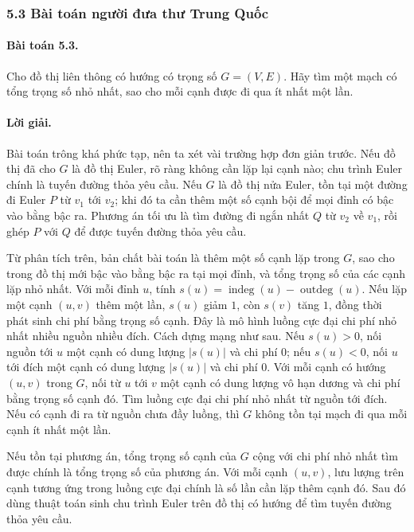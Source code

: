 \documentclass[11pt]{article}
\begin{document}
\subsubsection*{5.3 Bài toán người đưa thư Trung Quốc}

\paragraph{Bài toán 5.3.}
Cho đồ thị liên thông có hướng có trọng số \(G=(V,E)\). Hãy tìm một mạch có
tổng trọng số nhỏ nhất, sao cho mỗi cạnh được đi qua ít nhất một lần.

\paragraph{Lời giải.}
Bài toán trông khá phức tạp, nên ta xét vài trường hợp đơn giản trước. Nếu đồ
thị đã cho \(G\) là đồ thị Euler, rõ ràng không cần lặp lại cạnh nào; chu trình
Euler chính là tuyến đường thỏa yêu cầu. Nếu \(G\) là đồ thị nửa Euler, tồn tại
một đường đi Euler \(P\) từ \(v_1\) tới \(v_2\); khi đó ta cần thêm một số cạnh
bội để mọi đỉnh có bậc vào bằng bậc ra. Phương án tối ưu là tìm đường đi ngắn
nhất \(Q\) từ \(v_2\) về \(v_1\), rồi ghép \(P\) với \(Q\) để được tuyến đường
thỏa yêu cầu.

Từ phân tích trên, bản chất bài toán là thêm một số cạnh lặp trong \(G\), sao
cho trong đồ thị mới bậc vào bằng bậc ra tại mọi đỉnh, và tổng trọng số của các
cạnh lặp nhỏ nhất. Với mỗi đỉnh \(u\), tính
\(s(u)=\operatorname{indeg}(u)-\operatorname{outdeg}(u)\). Nếu lặp một cạnh
\((u,v)\) thêm một lần, \(s(u)\) giảm \(1\), còn \(s(v)\) tăng \(1\), đồng thời
phát sinh chi phí bằng trọng số cạnh. Đây là mô hình luồng cực đại chi phí nhỏ
nhất nhiều nguồn nhiều đích. Cách dựng mạng như sau. Nếu \(s(u)>0\), nối nguồn
tới \(u\) một cạnh có dung lượng \(|s(u)|\) và chi phí \(0\); nếu \(s(u)<0\),
nối \(u\) tới đích một cạnh có dung lượng \(|s(u)|\) và chi phí \(0\). Với mỗi
cạnh có hướng \((u,v)\) trong \(G\), nối từ \(u\) tới \(v\) một cạnh có dung
lượng vô hạn dương và chi phí bằng trọng số cạnh đó. Tìm luồng cực đại chi phí
nhỏ nhất từ nguồn tới đích. Nếu có cạnh đi ra từ nguồn chưa đầy luồng, thì
\(G\) không tồn tại mạch đi qua mỗi cạnh ít nhất một lần.

Nếu tồn tại phương án, tổng trọng số cạnh của \(G\) cộng với chi phí nhỏ nhất
tìm được chính là tổng trọng số của phương án. Với mỗi cạnh \((u,v)\), lưu
lượng trên cạnh tương ứng trong luồng cực đại chính là số lần cần lặp thêm cạnh
đó. Sau đó dùng thuật toán sinh chu trình Euler trên đồ thị có hướng để tìm
tuyến đường thỏa yêu cầu.
\end{document}
